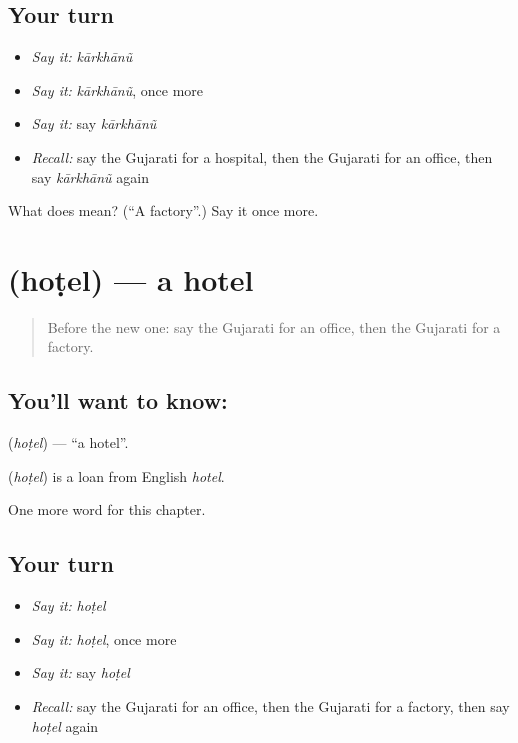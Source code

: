 \subsection*{Your turn}
\begin{itemize}
\raggedright
  \item \emph{Say it:} \emph{kārkhānũ}
  \item \emph{Say it:} \emph{kārkhānũ}, once more
  \item \emph{Say it:} say \emph{kārkhānũ}
  \item \emph{Recall:} say the Gujarati for a hospital, then the Gujarati for an office, then say \emph{kārkhānũ} again
\end{itemize}

\begin{tcolorbox}[breakable,colback=teal!4,colframe=teal!35!black,title={Before you move on}]
What does  mean? (\textquotedblleft{}A factory\textquotedblright{}.) Say it once more.
\end{tcolorbox}
\section[\texorpdfstring{\gu{હોટેલ} (hoṭel)}{હોટેલ (hoṭel)}]{ (hoṭel) — a hotel}

\label{lesson:GU-C128-hotel}



\begin{quote}
Before the new one: say the Gujarati for an office, then the Gujarati for a factory.
\end{quote}

\subsection*{You'll want to know: }
\textbf{} (\emph{hoṭel}) — \textquotedblleft{}a hotel\textquotedblright{}.

\begin{cousinweb}
\textbf{} (\emph{hoṭel}) is a loan from English \emph{hotel}.
\end{cousinweb}

\begin{grammarlens}[title={What you've built}]
One more word for this chapter.
\end{grammarlens}

\subsection*{Your turn}
\begin{itemize}
\raggedright
  \item \emph{Say it:} \emph{hoṭel}
  \item \emph{Say it:} \emph{hoṭel}, once more
  \item \emph{Say it:} say \emph{hoṭel}
  \item \emph{Recall:} say the Gujarati for an office, then the Gujarati for a factory, then say \emph{hoṭel} again
\end{itemize}

